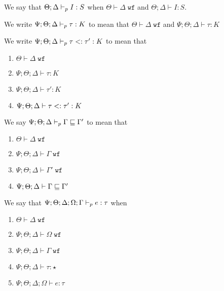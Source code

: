 \begin{definition}
We say that $\Theta ; \Delta \vdash_p I : S$ when $\Theta \vdash \Delta \; \texttt{wf}$ and $\Theta ; \Delta \vdash I : S$.
\end{definition}

\begin{definition}
We write $\Psi ; \Theta ; \Delta \vdash_p \tau : K$ to mean that $\Theta \vdash \Delta \; \texttt{wf}$ and $\Psi ; \Theta ; \Delta \vdash \tau : K$
\end{definition}

\begin{definition}
We write $\Psi ; \Theta ; \Delta \vdash_p \tau <: \tau' : K$ to mean that
\begin{enumerate}
  \item $\Theta \vdash \Delta \; \texttt{wf}$
  \item $\Psi ; \Theta ; \Delta \vdash \tau : K$
  \item $\Psi ; \Theta ; \Delta \vdash \tau' : K$
  \item $\Psi ; \Theta ; \Delta \vdash \tau <: \tau' : K$
\end{enumerate}
\end{definition}

\begin{definition}
We say $\Psi ; \Theta ; \Delta \vdash_p \Gamma \sqsubseteq \Gamma'$ to mean that
\begin{enumerate}
  \item $\Theta \vdash \Delta \; \texttt{wf}$
  \item $\Psi ; \Theta ; \Delta \vdash \Gamma \; \texttt{wf}$
  \item $\Psi ; \Theta ; \Delta \vdash \Gamma' \; \texttt{wf}$
  \item $\Psi ; \Theta ; \Delta \vdash \Gamma \sqsubseteq \Gamma'$
\end{enumerate}
\end{definition}

\begin{definition}
We say that $\Psi ; \Theta ; \Delta ; \Omega ; \Gamma \vdash_p e : \tau$ when
\begin{enumerate}
  \item $\Theta \vdash \Delta \; \texttt{wf}$
  \item $\Psi ; \Theta ; \Delta \vdash \Omega \; \texttt{wf}$
  \item $\Psi ; \Theta ; \Delta \vdash \Gamma \; \texttt{wf}$
  \item $\Psi ; \Theta ; \Delta \vdash \tau : \star$
  \item $\Psi ; \Theta ; \Delta ; \Omega \vdash e : \tau$
\end{enumerate}
\end{definition}

